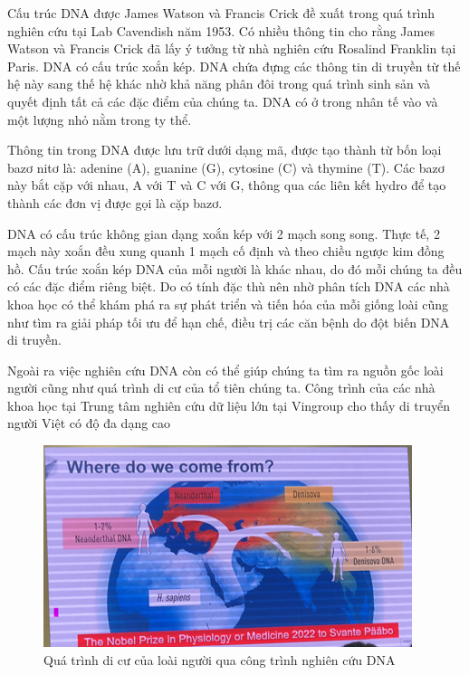 \documentclass[14pt, a4paper]{article}
\numberwithin{equation}{section}
\numberwithin{figure}{section}
\numberwithin{dl}{section}
\numberwithin{md}{section}
\numberwithin{bd}{section}
\numberwithin{dn}{section}
\numberwithin{hq}{section}
\begin{document}
    Cấu trúc DNA được James Watson và Francis Crick đề xuất trong quá trình nghiên cứu tại Lab Cavendish năm 1953.
    Có nhiều thông tin cho rằng James Watson và Francis Crick đã lấy ý tưởng từ nhà nghiên cứu Rosalind Franklin tại Paris.
    DNA có cấu trúc xoắn kép. DNA chứa đựng các thông tin di truyền từ thế hệ này sang thế hệ khác nhờ khả năng phân đôi trong quá trình sinh sản và quyết định tất cả các đặc điểm của chúng ta. DNA có ở trong nhân tế vào và một lượng nhỏ nằm trong ty thể. 
    
    Thông tin trong DNA được lưu trữ dưới dạng mã, được tạo thành từ bốn loại bazơ nitơ là: adenine (A), guanine (G), cytosine (C) và thymine (T). Các bazơ này bắt cặp với nhau, A với T và C với G, thông qua các liên kết hydro để tạo thành các đơn vị được gọi là cặp bazơ.

    DNA có cấu trúc không gian dạng xoắn kép với 2 mạch song song. Thực tế, 2 mạch này xoắn đều xung quanh 1 mạch cố định và theo chiều ngược kim đồng hồ. Cấu trúc xoắn kép DNA của mỗi người là khác nhau, do đó mỗi chúng ta đều có các đặc điểm riêng biệt. Do có tính đặc thù nên nhờ phân tích DNA các nhà khoa học có thể khám phá ra sự phát triển và tiến hóa của mỗi giống loài cũng như tìm ra giải pháp tối ưu để hạn chế, điều trị các căn bệnh do đột biến DNA di truyền.

    Ngoài ra việc nghiên cứu DNA còn có thể giúp chúng ta tìm ra nguồn gốc loài người cũng như quá trình di cư của tổ tiên chúng ta.
    Công trình của các nhà khoa học tại Trung tâm nghiên cứu dữ liệu lớn tại Vingroup cho thấy di truyển người Việt có độ đa dạng cao

    \begin{figure}[h!]
        \centering
        \includegraphics{immgrants_process.png}
        \caption{Quá trình di cư của loài người qua công trình nghiên cứu DNA}
    \end{figure}
\end{document}
